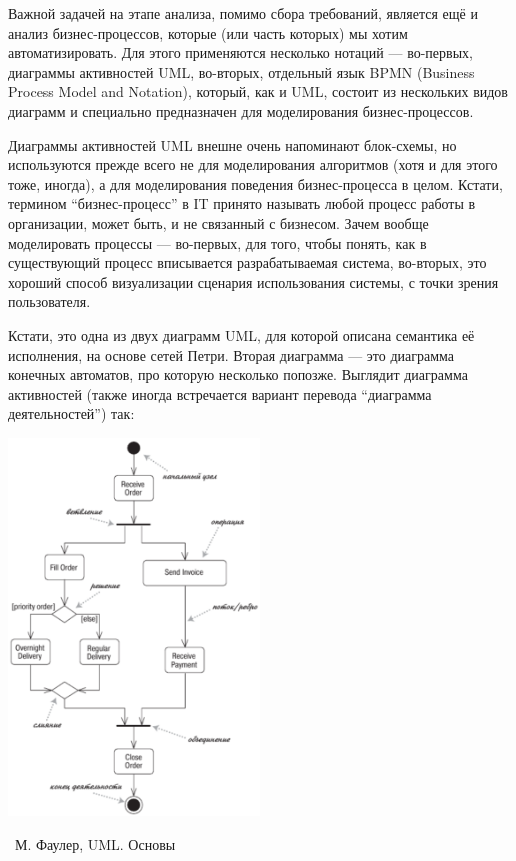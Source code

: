 \documentclass[a5paper]{article}
\newcommand{\attribution}[1] {
	\vspace{-5mm}\begin{flushright}\begin{scriptsize}%
	{\textcopyright\, #1}\end{scriptsize}\end{flushright}
}
\begin{document}
Важной задачей на этапе анализа, помимо сбора требований, является ещё и анализ бизнес-процессов, которые (или часть которых) мы хотим автоматизировать. Для этого применяются несколько нотаций --- во-первых, диаграммы активностей UML, во-вторых, отдельный язык BPMN (Business Process Model and Notation), который, как и UML, состоит из нескольких видов диаграмм и специально предназначен для моделирования бизнес-процессов.

Диаграммы активностей UML внешне очень напоминают блок-схемы, но используются прежде всего не для моделирования алгоритмов (хотя и для этого тоже, иногда), а для моделирования поведения бизнес-процесса в целом. Кстати, термином ``бизнес-процесс'' в IT принято называть любой процесс работы в организации, может быть, и не связанный с бизнесом. Зачем вообще моделировать процессы --- во-первых, для того, чтобы понять, как в существующий процесс вписывается разрабатываемая система, во-вторых, это хороший способ визуализации сценария использования системы, с точки зрения пользователя.

Кстати, это одна из двух диаграмм UML, для которой описана семантика её исполнения, на основе сетей Петри. Вторая диаграмма --- это диаграмма конечных автоматов, про которую несколько попозже. Выглядит диаграмма активностей (также иногда встречается вариант перевода ``диаграмма деятельностей'') так:

\begin{center}
	\includegraphics[width=0.5\textwidth]{activityDiagram.png}
	\attribution{М. Фаулер, UML. Основы}
\end{center}
\end{document}
